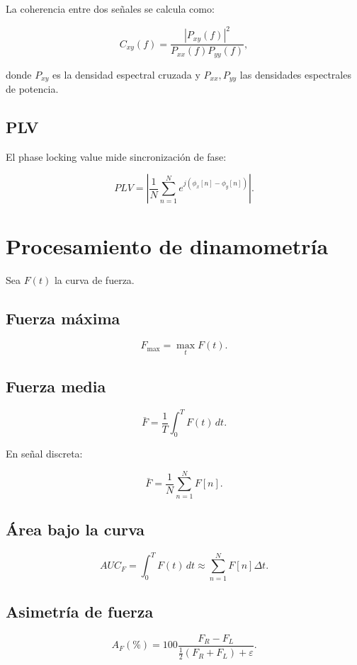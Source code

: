 \documentclass[12pt,a4paper]{article}
\begin{document}
La coherencia entre dos señales se calcula como:

\[
C_{xy}(f)
=
\frac{|P_{xy}(f)|^2}
{P_{xx}(f)P_{yy}(f)},
\]

donde \(P_{xy}\) es la densidad espectral cruzada y \(P_{xx},P_{yy}\) las densidades espectrales de potencia.

\subsection{PLV}

El phase locking value mide sincronización de fase:

\[
PLV =
\left|
\frac{1}{N}
\sum_{n=1}^{N}
e^{j(\phi_x[n]-\phi_y[n])}
\right|.
\]

\section{Procesamiento de dinamometría}

Sea \(F(t)\) la curva de fuerza.

\subsection{Fuerza máxima}

\[
F_{\max}=\max_t F(t).
\]

\subsection{Fuerza media}

\[
\bar{F}=
\frac{1}{T}
\int_0^T F(t)\,dt.
\]

En señal discreta:

\[
\bar{F}
=
\frac{1}{N}
\sum_{n=1}^{N}
F[n].
\]

\subsection{Área bajo la curva}

\[
AUC_F =
\int_0^T F(t)\,dt
\approx
\sum_{n=1}^{N}
F[n]\Delta t.
\]

\subsection{Asimetría de fuerza}

\[
A_F(\%)
=
100
\frac{F_R-F_L}
{\frac{1}{2}(F_R+F_L)+\varepsilon}.
\]
\end{document}

